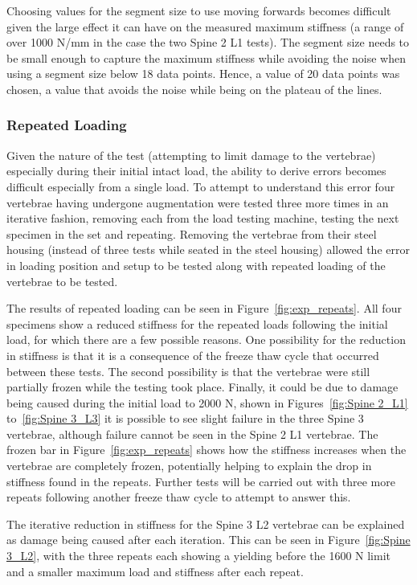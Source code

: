 Choosing values for the segment size to use moving forwards becomes difficult
given the large effect it can have on the measured maximum stiffness (a range of
over 1000 N/mm in the case the two Spine 2 L1 tests). The segment size needs to
be small enough to capture the maximum stiffness while avoiding the noise when
using a segment size below 18 data points. Hence, a value of 20 data points was
chosen, a value that avoids the noise while being on the plateau of the lines.


\subsubsection{Repeated Loading}

Given the nature of the test (attempting to limit damage to the vertebrae)
especially during their initial intact load, the ability to derive errors
becomes difficult especially from a single load. To attempt to understand this
error four vertebrae having undergone augmentation were tested three more times
in an iterative fashion, removing each from the load testing machine, testing
the next specimen in the set and repeating. Removing the vertebrae from their
steel housing (instead of three tests while seated in the steel housing) allowed
the error in loading position and setup to be tested along with repeated loading
of the vertebrae to be tested.

The results of repeated loading can be seen in Figure~\ref{fig:exp_repeats}. All
four specimens show a reduced stiffness for the repeated loads following the
initial load, for which there are a few possible reasons. One possibility for
the reduction in stiffness is that it is a consequence of the freeze thaw cycle
that occurred between these tests. The second possibility is that the vertebrae
were still partially frozen while the testing took place. Finally, it could be
due to damage being caused during the initial load to 2000 N, shown in Figures~\ref{fig:Spine 2_L1} to~\ref{fig:Spine 3_L3} it is possible to see slight failure
in the three Spine 3 vertebrae, although failure cannot be seen in the Spine 2 L1
vertebrae. The frozen bar in Figure~\ref{fig:exp_repeats} shows how the
stiffness increases when the vertebrae are completely frozen, potentially
helping to explain the drop in stiffness found in the repeats. Further tests
will be carried out with three more repeats following another freeze thaw cycle
to attempt to answer this.

The iterative reduction in stiffness for the Spine 3 L2 vertebrae can be
explained as damage being caused after each iteration. This can be seen in
Figure~\ref{fig:Spine 3_L2}, with the three repeats each showing a yielding
before the 1600 N limit and a smaller maximum load and stiffness after each
repeat.


